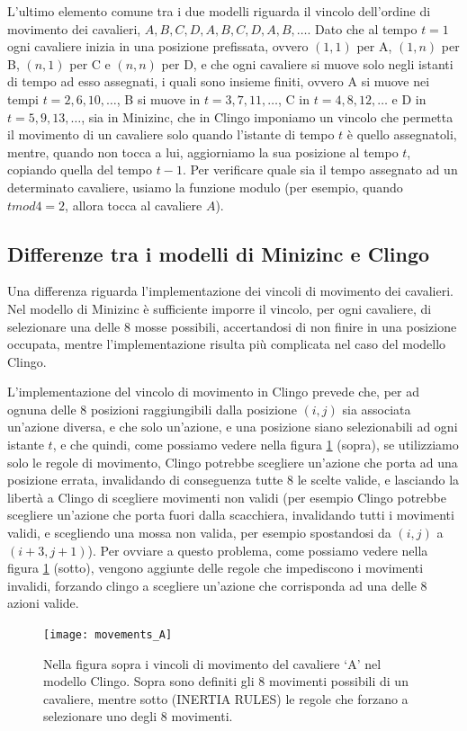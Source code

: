 \documentclass[12pt]{article}
\begin{document}
L'ultimo elemento comune tra i due modelli riguarda il vincolo dell'ordine di movimento dei cavalieri, $A,B,C,D,A,B,C,D,A,B,\dots$. 
Dato che al tempo $t=1$ ogni cavaliere inizia in una posizione prefissata, ovvero $(1,1)$ per A, $(1,n)$ per B, $(n,1)$ per C e $(n,n)$ per D, e che ogni cavaliere si muove solo negli istanti di tempo ad esso assegnati, i quali sono insieme finiti, ovvero A si muove nei tempi $t=2,6,10,\dots$, 
B si muove in $t=3,7,11,\dots$, C in $t=4,8,12,\dots$ e D in $t=5,9,13,\dots$, sia in Minizinc, che in Clingo imponiamo un vincolo che permetta il movimento di un cavaliere solo quando l'istante di tempo $t$ è quello assegnatoli, mentre, quando non tocca a lui, 
aggiorniamo la sua posizione al tempo $t$, copiando quella del tempo $t-1$. Per verificare quale sia il tempo assegnato ad un determinato cavaliere, usiamo la funzione modulo (per esempio, quando $t mod 4 = 2$, allora tocca al cavaliere $A$).

\subsection{Differenze tra i modelli di Minizinc e Clingo}
Una differenza riguarda l'implementazione dei vincoli di movimento dei cavalieri. 
Nel modello di Minizinc è sufficiente imporre il vincolo, per ogni cavaliere, di selezionare una delle 8 mosse possibili, accertandosi di non finire in una posizione occupata, mentre l'implementazione risulta più complicata nel caso del modello Clingo. 

L'implementazione del vincolo di movimento in Clingo prevede che, per ad ognuna delle 8 posizioni raggiungibili dalla posizione $(i,j)$ sia associata un'azione diversa, e che solo un'azione, e una posizione siano selezionabili ad ogni istante $t$, e che quindi, come possiamo vedere nella figura \ref{img:visited_clingo} (sopra), 
se utilizziamo solo le regole di movimento, Clingo potrebbe scegliere un'azione che porta ad una posizione errata, invalidando di conseguenza tutte 8 le scelte valide, e lasciando la libertà a Clingo di scegliere movimenti non validi (per esempio Clingo potrebbe scegliere un'azione che porta fuori dalla scacchiera, invalidando tutti i movimenti validi, e scegliendo una mossa non valida, per esempio spostandosi da $(i,j)$ a $(i+3,j+1)$). 
Per ovviare a questo problema, come possiamo vedere nella figura \ref{img:visited_clingo} (sotto), vengono aggiunte delle regole che impediscono i movimenti invalidi, forzando clingo a scegliere un'azione che corrisponda ad una delle 8 azioni valide. 
\begin{figure}[H]
    \centering
    \texttt{[image: movements\_A]}
    \caption{Nella figura sopra i vincoli di movimento del cavaliere ‘A’ nel modello Clingo. 
    Sopra sono definiti gli 8 movimenti possibili di un cavaliere, mentre sotto (INERTIA RULES) le regole che forzano a selezionare uno degli 8 movimenti.}
    \label{img:visited_clingo}
\end{figure}
\end{document}
